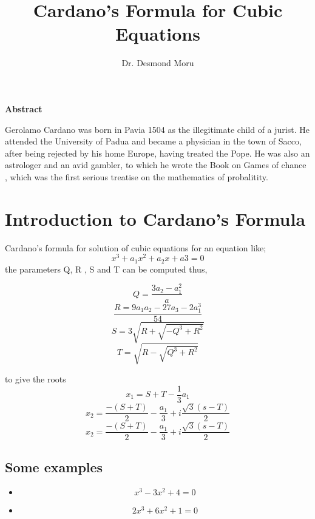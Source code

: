 \documentclass{article}
\begin{document}
	\author{Dr. Desmond Moru}
	\title{Cardano's Formula for Cubic Equations}
	\maketitle
	
	
	
	\begin{center}
		\textbf{Abstract}
	\end{center}
	Gerolamo Cardano was born in Pavia 1504 as the illegitimate child of a jurist. He attended the University of Padua and became a physician in the town of Sacco, after being rejected by his home Europe, having treated the Pope. He was also an astrologer and an avid gambler, to which he wrote the Book on Games of chance , which was the first serious treatise on the mathematics of probalitity. \cite{cardano}
	
	\section{ Introduction to Cardano's Formula}
	Cardano's formula for solution of cubic equations for an equation like;
	\begin{equation}
		x^3 + a_1x^2 + a_2x + a3 = 0
	\end{equation}
	the parameters Q, R , S and T can be computed thus,
	
	\begin{equation}
		Q= \frac{3a_{2} - a_{1}^2}{a}
	\end{equation}
\begin{equation}
\frac{R=9a_{1}a_{2}-27a_{3}-2a_{1}^3}{54}	
\end{equation}
\begin{equation}
	S=3\sqrt{R +\sqrt{-Q^3 + R^2}}
\end{equation}
\begin{equation}
	T=\sqrt{R-\sqrt{Q^3 + R^2}}
\end{equation}

to give the roots
\begin{equation}
	x_{1}= S + T -\frac{1}{3}a_{1}
\end{equation}
\begin{equation}
		x_{2} =\frac{-(S +T)}{2} -\frac{a_{1}}{3} + i\frac{\sqrt{3}(s-T)}{2}
\end{equation}
\begin{equation}
	x_{2} =\frac{-(S +T)}{2} -\frac{a_{1}}{3} + i\frac{\sqrt{3}(s-T)}{2}
\end{equation}
\subsection{Some examples}

\begin{itemize}
\item	\begin{equation}
		x^3 - 3x^2 + 4 =0
	\end{equation}
\item\begin{equation}
	2x^3 + 6x^2 + 1 =0
\end{equation}
\end{itemize}



\end{document}
